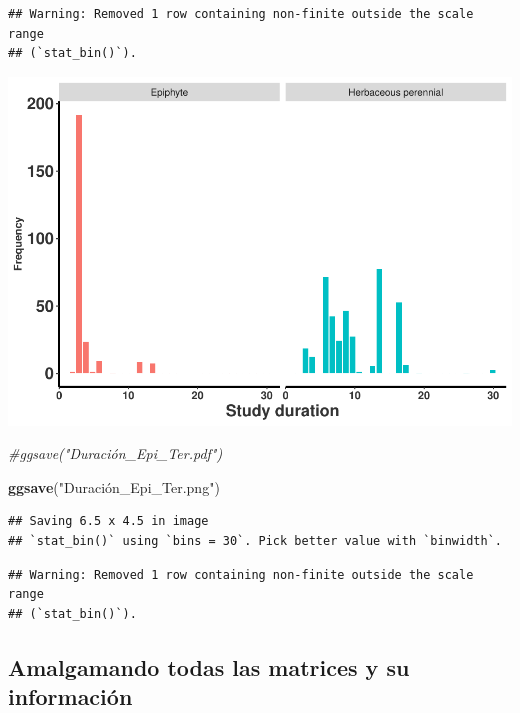 \documentclass[
]{book}
\newenvironment{Shaded}{\begin{snugshade}}{\end{snugshade}}
\newcommand{\CommentTok}[1]{\textcolor[rgb]{0.56,0.35,0.01}{\textit{#1}}}
\newcommand{\FunctionTok}[1]{\textcolor[rgb]{0.13,0.29,0.53}{\textbf{#1}}}
\newcommand{\NormalTok}[1]{#1}
\newcommand{\OtherTok}[1]{\textcolor[rgb]{0.56,0.35,0.01}{#1}}
\newcommand{\SpecialCharTok}[1]{\textcolor[rgb]{0.81,0.36,0.00}{\textbf{#1}}}
\newcommand{\StringTok}[1]{\textcolor[rgb]{0.31,0.60,0.02}{#1}}
\theoremstyle{definition}
\theoremstyle{definition}
\theoremstyle{definition}
\theoremstyle{definition}
\theoremstyle{remark}
\begin{document}
\begin{verbatim}
## Warning: Removed 1 row containing non-finite outside the scale range
## (`stat_bin()`).
\end{verbatim}

\includegraphics{Diagnostico_Poblacional_files/figure-latex/chap16_14-1.pdf}

\begin{Shaded}
\begin{Highlighting}[]
\CommentTok{\#ggsave("Duración\_Epi\_Ter.pdf")}

\FunctionTok{ggsave}\NormalTok{(}\StringTok{"Duración\_Epi\_Ter.png"}\NormalTok{)}
\end{Highlighting}
\end{Shaded}

\begin{verbatim}
## Saving 6.5 x 4.5 in image
## `stat_bin()` using `bins = 30`. Pick better value with `binwidth`.
\end{verbatim}

\begin{verbatim}
## Warning: Removed 1 row containing non-finite outside the scale range
## (`stat_bin()`).
\end{verbatim}

\subsection{Amalgamando todas las matrices y su información}\label{amalgamando-todas-las-matrices-y-su-informaciuxf3n}

\begin{Shaded}
\end{Shaded}
\end{document}
